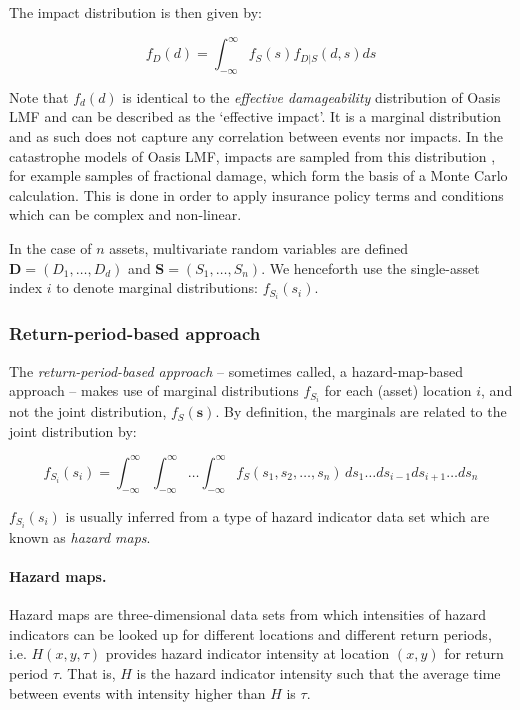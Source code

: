 \documentclass[a4paper,11pt]{extarticle} %
\begin{document}
The impact distribution is then given by: 
 
  \begin{equation}
 	\label{Eq:ImpactEffective}
 	f_D(d) = \int_{-\infty}^{\infty} f_S(s) f_{D|S}(d, s) ds
 \end{equation}

Note that $f_d(d)$ is identical to the {\it effective damageability} distribution of Oasis LMF\cite{OasisFinancialModule} and can be described as the `effective impact'. It is a marginal distribution and as such does not capture any correlation between events nor impacts. In the catastrophe models of Oasis LMF, impacts are sampled from this distribution \cite{OasisFinancialModule}, for example samples of fractional damage, which form the basis of a Monte Carlo calculation. This is done in order to apply insurance policy terms and conditions which can be complex and non-linear.

In the case of $n$ assets, multivariate random variables are defined $\mathbf{D} = (D_1,\ldots,D_d)$ and $\mathbf{S} = (S_1,\ldots,S_n)$. We henceforth use the single-asset index $i$ to denote marginal distributions: $f_{S_i}(s_i)$. 

\subsubsection{Return-period-based approach}

The \emph{return-period-based approach} -- sometimes called, a hazard-map-based approach -- makes use of marginal distributions $f_{S_i}$ for each (asset) location $i$, and not the joint distribution, $f_S(\mathbf{s})$. By definition, the marginals are related to the joint distribution by: 

 \begin{equation}
	\label{Eq:ImpactMarginal}
	f_{S_i}(s_i) = \int_{-\infty}^{\infty} \int_{-\infty}^{\infty} \dots \int_{-\infty}^{\infty} f_S(s_1,s_2, \dots,s_n) \,ds_1 \dots ds_{i-1} ds_{i + 1} \dots ds_n
\end{equation}

$f_{S_i}(s_i)$ is usually inferred from a type of hazard indicator data set which are known as \emph{hazard maps}.

\paragraph{Hazard maps.} Hazard maps are three-dimensional data sets from which intensities of hazard indicators can be looked up for different locations and different return periods, i.e. $H(x, y, \tau)$ provides hazard indicator intensity at location $(x, y)$ for return period $\tau$. That is, $H$ is the hazard indicator intensity such that the average time between events with intensity higher than $H$ is $\tau$. 
\end{document}
